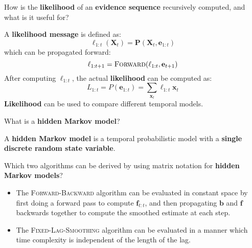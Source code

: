 \begin{flashcard}[Question]{How is the \textbf{likelihood} of an \textbf{evidence sequence} recursively computed, and what is it useful for?}
\begin{center}
A \textbf{likelihood message} is defined as:
\begin{displaymath}
\ell_{1:t}(\mathbf{X}_t) = \mathbf{P}(\mathbf{X}_t, \mathbf{e}_{1:t})
\end{displaymath}
which can be propagated forward:
\begin{displaymath}
\ell_{1:t+1} = \textsc{Forward}(\ell_{1:t}, \mathbf{e}_{t+1})
\end{displaymath}
After computing $\ell_{1:t}$, the actual \textbf{likelihood} can be computed as:
\begin{displaymath}
L_{1:t} = P(\mathbf{e}_{1:t}) = \sum_{\mathbf{x}_t} \ell_{1:t} \mathbf{x}_t
\end{displaymath}
\textbf{Likelihood} can be used to compare different temporal models.
\end{center}
\end{flashcard}

\begin{flashcard}[Question]{What is a \textbf{hidden Markov model}?}
\begin{center}
A \textbf{hidden Markov model} is a temporal probabilistic model with a \textbf{single discrete random state variable}.
\end{center}
\end{flashcard}

\begin{flashcard}[Question]{Which two algorithms can be derived by using matrix notation for \textbf{hidden Markov models}?}
\begin{itemize}
\item The \textsc{Forward-Backward} algorithm can be evaluated in constant space by first doing a forward pass to compute $\mathbf{f}_{t:t}$, and then propagating $\mathbf{b}$ and $\mathbf{f}$ backwards together to compute the smoothed estimate at each step.
\item The \textsc{Fixed-Lag-Smoothing} algorithm can be evaluated in a manner which time complexity is independent of the length of the lag.
\end{itemize}
\end{flashcard}

